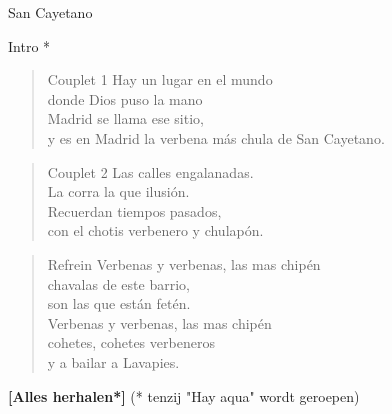 \begin{song}{San Cayetano}
\begin{instrumental}{Intro}
   \measure{}
  * \measure{}%
   \hspace{3em} \measure{}
   
\end{instrumental}

\begin{verse}{Couplet 1}
Hay un lugar en el mundo\\
donde Dios puso la mano\\
\chord{}Madrid se llama ese sitio,\\
y es en Madrid la verbena m\'{a}s chula de San Cayetano.\\
\end{verse}

\begin{verse}{Couplet 2}
Las calles engalanadas.\\
La corra la que ilusi\'{o}n.\\
Recuerdan tiempos pasados,\\
con el chotis verbenero y chulap\'{o}n.\hspace{1.75em}\\
\end{verse}

\begin{verse}{Refrein}
Verbenas y verbenas, las mas chip\'{e}n\\
\chord{}chavalas de este barrio,\\
son las que est\'{a}n fet\'{e}n.\\
Verbenas y verbenas, las mas chip\'{e}n\\
cohetes, cohetes verbeneros\\
y a bailar a Lavapies.\hspace{1.75em}\\
\end{verse}

\textbf{[Alles herhalen*]}\hspace{10em} (* tenzij "Hay aqua" wordt geroepen)
\end{song}